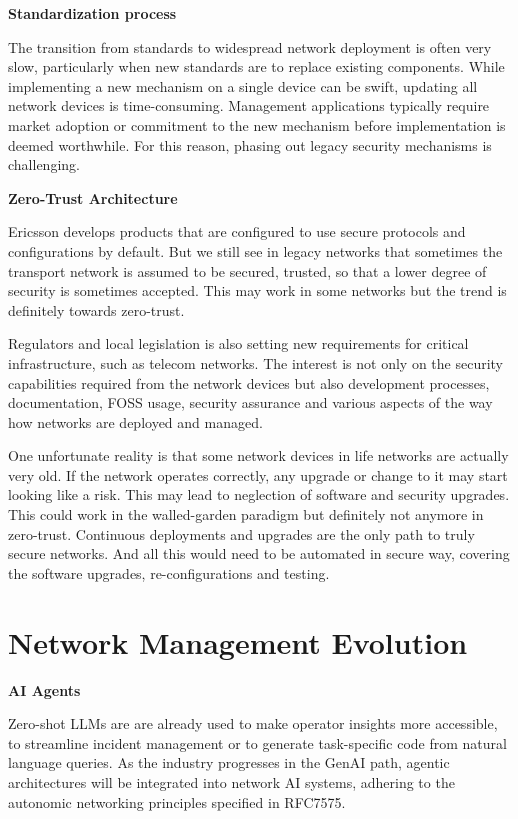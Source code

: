 \documentclass[11pt,sigconf]{iabart}
\begin{document}
\textbf{Standardization process}

The transition from standards to widespread network deployment is often very slow, particularly when new standards are to replace existing components. While implementing a new mechanism on a single device can be swift, updating all network devices is time-consuming. Management applications typically require market adoption or commitment to the new mechanism before implementation is deemed worthwhile. For this reason, phasing out legacy security mechanisms is challenging.
 
\textbf{Zero-Trust Architecture}

Ericsson develops products that are configured to use secure protocols and configurations by default. But we still see in legacy networks that sometimes the transport network is assumed to be secured, trusted, so that a lower degree of security is sometimes accepted. This may work in some networks but the trend is definitely towards zero-trust. 

Regulators and local legislation is also setting new requirements for critical infrastructure, such as telecom networks. The interest is not only on the security capabilities required from the network devices but also development processes, documentation, FOSS usage, security assurance and various aspects of the way how networks are deployed and managed.

One unfortunate reality is that some network devices in life networks are actually very old. If the network operates correctly, any upgrade or change to it may start looking like a risk. This may lead to neglection of software and security upgrades. This could work in the walled-garden paradigm but definitely not anymore in zero-trust. Continuous deployments and upgrades are the only path to truly secure networks. And all this would need to be automated in secure way, covering the software upgrades, re-configurations and testing.

 
\section{Network Management Evolution} \label{insights}




\textbf{AI Agents}

Zero-shot LLMs are are already used to make operator insights more accessible, to streamline incident management or to generate task-specific code from natural language queries. As the industry progresses in the GenAI path, agentic architectures will be integrated into network AI systems, adhering to the autonomic networking principles specified in RFC7575.
\end{document}
